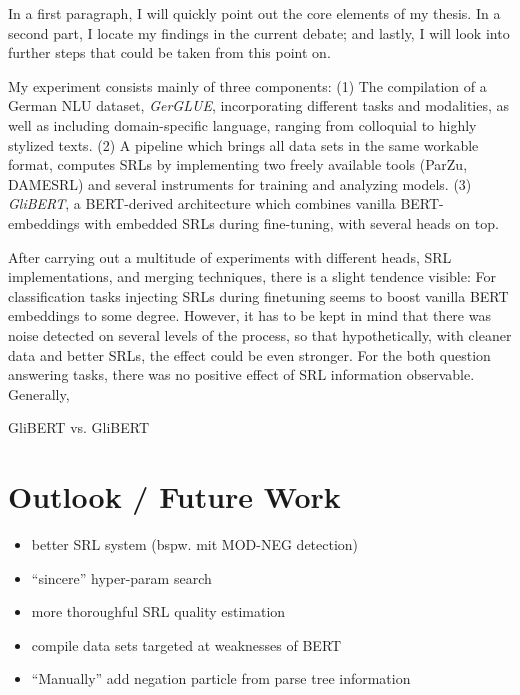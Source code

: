 \label{chap:6_conclusion}


In a first paragraph, I will quickly point out the core elements of my thesis. In a second part, I
locate my findings in the current debate; and lastly, I will look into further steps that could be
taken from this point on.

My experiment consists mainly of three components: (1) The compilation of a German NLU
dataset, \emph{GerGLUE}, incorporating different tasks and modalities, as well as
including domain-specific language, ranging from colloquial to highly stylized texts.
(2) A pipeline which brings all data sets in the same workable format, computes SRLs
by implementing two freely available tools (ParZu, DAMESRL) and several instruments
for training and analyzing models. (3) \emph{GliBERT}, a BERT-derived architecture
which combines vanilla BERT-embeddings with embedded SRLs during fine-tuning, with
several heads on top.

After carrying out a multitude of experiments with different heads, SRL implementations,
and merging techniques, there is a slight tendence visible: For classification tasks
injecting SRLs during finetuning seems to boost vanilla BERT embeddings to some degree.
However, it has to be kept in mind that there was noise detected on several levels of
the process, so that hypothetically, with cleaner data and better SRLs, the effect
could be {\color{red} even stronger}. For the both question answering tasks, there
was no positive effect of SRL information observable. Generally,


GliBERT vs. GliBERT


\section{Outlook / Future Work}



\begin{itemize}
  \item better SRL system (bspw. mit MOD-NEG detection)
  \item ``sincere'' hyper-param search
  \item more thoroughful SRL quality estimation
  \item compile data sets targeted at weaknesses of BERT
  \item ``Manually'' add negation particle from parse tree information
\end{itemize}


